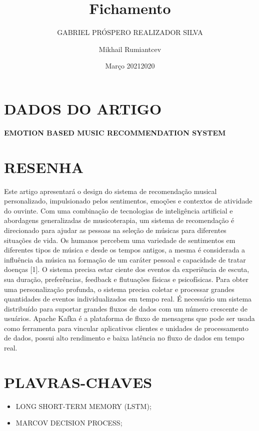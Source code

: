 \documentclass{article}
\title{Fichamento}
\author{GABRIEL PRÓSPERO REALIZADOR  SILVA}
\date{Março 2021}
\begin{document}
\maketitle

\section{DADOS DO ARTIGO}
\textbf{EMOTION BASED MUSIC RECOMMENDATION SYSTEM \\}
\author{Mikhail Rumiantcev \\}
\date{2020}

\section{RESENHA}
Este artigo apresentará o design do sistema de recomendação musical personalizado, impulsionado pelos sentimentos, emoções e contextos de atividade do ouvinte. Com uma combinação de tecnologias de inteligência artificial e abordagens generalizadas de musicoterapia, um sistema de recomendação é direcionado para ajudar as pessoas na seleção de músicas para diferentes situações de vida. Os humanos percebem uma variedade de sentimentos em diferentes tipos de música e desde os tempos antigos, a mesma é considerada a influência da música na formação de um caráter pessoal e capacidade de tratar doenças [1]. O sistema precisa estar ciente dos eventos da experiência de escuta, sua duração, preferências, feedback e flutuações físicas e psicofísicas. Para obter uma personalização profunda, o sistema precisa coletar e processar grandes quantidades de eventos individualizados em tempo real. É necessário um sistema distribuído para suportar grandes fluxos de dados com um número crescente de usuários. Apache Kafka é a plataforma de fluxo de mensagens que pode ser usada como ferramenta para vincular aplicativos clientes e unidades de processamento de dados, possui alto rendimento e baixa latência no fluxo de dados em tempo real. 

\section{PLAVRAS-CHAVES}
\begin{itemize}
    \item LONG SHORT-TERM MEMORY (LSTM); 
    \item MARCOV DECISION PROCESS;
\end{itemize}
\end{document}
